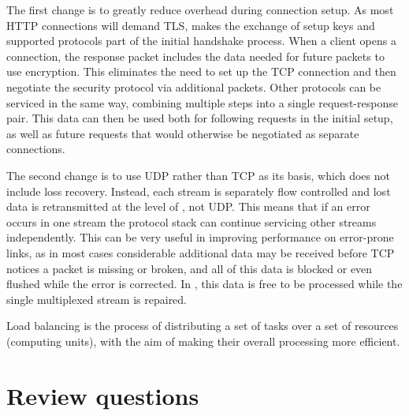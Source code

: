 The first change is to greatly reduce overhead during connection setup.
As most \acs{HTTP} connections will demand \acs{TLS},  makes the exchange of setup keys and supported protocols part of the initial handshake process.
When a client opens a connection, the response packet includes the data needed for future packets to use encryption.
This eliminates the need to set up the \acs{TCP} connection and then negotiate the security protocol via additional packets.
Other protocols can be serviced in the same way, combining multiple steps into a single request-response pair.
This data can then be used both for following requests in the initial setup, as well as future requests that would otherwise be negotiated as separate connections.

The second change is to use \acs{UDP} rather than \acs{TCP} as its basis, which does not include loss recovery.
Instead, each  stream is separately flow controlled and lost data is retransmitted at the level of , not \acs{UDP}.
This means that if an error occurs in one stream the protocol stack can continue servicing other streams independently.
This can be very useful in improving performance on error-prone links, as in most cases considerable additional data may be received before \acs{TCP} notices a packet is missing or broken, and all of this data is blocked or even flushed while the error is corrected.
In , this data is free to be processed while the single multiplexed stream is repaired.





Load balancing is the process of distributing a set of tasks over a set of resources (computing units), with the aim of making their overall processing more efficient.


\section{Review questions}
\label{sec:transport-review-qu}

